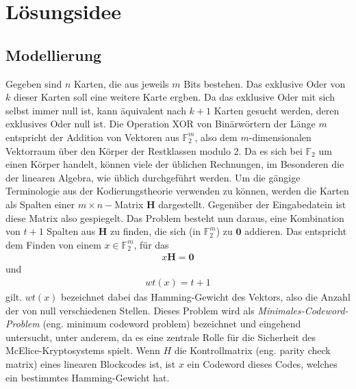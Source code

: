 \documentclass[a4paper,10pt,ngerman]{scrartcl}
\begin{document}
\maketitle
\tableofcontents

\section{Lösungsidee}
\subsection{Modellierung}
Gegeben sind $n$ Karten, die aus jeweils $m$ Bits bestehen. Das exklusive Oder von $k$ dieser Karten soll eine weitere Karte ergben.
Da das exklusive Oder mit sich selbst immer null ist, kann äquivalent nach $k + 1$ Karten gesucht werden, deren exklusives Oder null ist.
Die Operation XOR von Binärwörtern der Länge $m$ entspricht der Addition von Vektoren aus $\mathbb{F}_2^m$, also dem $m$-dimensionalen Vektorraum über den Körper der Restklassen modulo 2. 
Da es sich bei $\mathbb{F}_2$ um einen Körper handelt, können viele der üblichen Rechnungen, im Besonderen die der linearen Algebra, wie üblich durchgeführt werden. 
Um die gängige Terminologie aus der Kodierungstheorie verwenden zu können, werden die Karten als Spalten einer $m\times n-$Matrix $\mathbf{H}$ dargestellt. Gegenüber der Eingabedatein ist diese Matrix also gespiegelt. 
Das Problem besteht nun daraus, eine Kombination von $t + 1$ Spalten aus $\mathbf{H}$ zu finden, die sich (in $\mathbb{F}_2^m$) zu $\mathbf{0}$ addieren. Das entspricht dem Finden von einem $x \in \mathbb{F}^m_2$, für das 
\begin{align*}
    x \mathbf{H} = \mathbf{0}
\end{align*}
und 
\begin{align*}
    wt(x) = t+1
\end{align*}
gilt. $wt(x)$ bezeichnet dabei das Hamming-Gewicht des Vektors, also die Anzahl der von null verschiedenen Stellen. 
Dieses Problem wird als \textit{Minimales-Codeword-Problem} (eng. minimum codeword problem) bezeichnet und eingehend untersucht, unter anderem, da es eine zentrale Rolle für die Sicherheit des McElice-Kryptosystems spielt. 
Wenn $H$ die Kontrollmatrix (eng. parity check matrix) eines linearen Blockcodes ist, ist $x$ ein Codeword dieses Codes, welches ein bestimmtes Hamming-Gewicht hat. 
\end{document}
